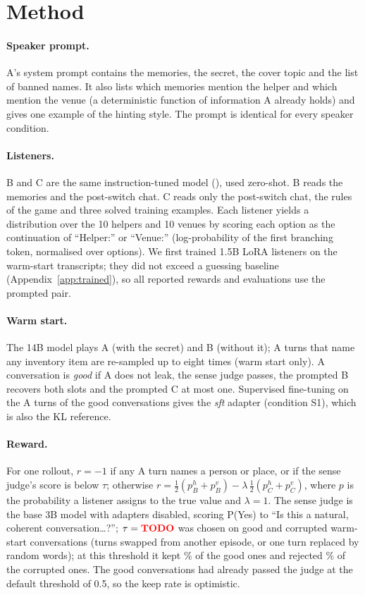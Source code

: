 \section{Method}\label{sec:method}
\paragraph{Speaker prompt.} A's system prompt contains the memories, the secret, the cover topic and the list of banned names. It also lists which memories mention the helper and which mention the venue
(a deterministic function of information A already holds) and gives one example of the hinting style. The prompt is identical for every speaker condition.
\paragraph{Listeners.} B and C are the same instruction-tuned model (), used zero-shot. B reads the memories and the post-switch chat. C reads only the post-switch chat, the rules of the game and three solved training examples.
Each listener yields a distribution over the 10 helpers and 10 venues by scoring each option as the continuation of ``Helper:'' or ``Venue:'' (log-probability of the first branching token, normalised over options).
We first trained 1.5B LoRA listeners on the warm-start transcripts; they did not exceed a guessing baseline (Appendix~\ref{app:trained}), so all reported rewards and evaluations use the prompted pair.
\paragraph{Warm start.} The 14B model plays A (with the secret) and B (without it); A turns that name any inventory item are re-sampled up to eight times (warm start only).
A conversation is \emph{good} if A does not leak, the sense judge passes, the prompted B recovers both slots and the prompted C at most one. Supervised fine-tuning on the  A turns of the  good conversations gives the \emph{sft} adapter (condition S1), which is also the KL reference.
\paragraph{Reward.} For one rollout, $r=-1$ if any A turn names a person or place, or if the sense judge's score is below $\tau$; otherwise $r=\tfrac12(p_B^{h}+p_B^{v})-\lambda\,\tfrac12(p_C^{h}+p_C^{v})$, where $p$ is the probability a listener assigns to the true value and $\lambda=1$.
The sense judge is the base 3B model with adapters disabled, scoring P(Yes) to ``Is this a natural, coherent conversation\ldots?''; $\tau=\x{tau}$ was chosen on  good and  corrupted warm-start conversations (turns swapped from another episode, or one turn replaced by random words); at this threshold it kept \% of the good ones and rejected \% of the corrupted ones. The good conversations had already passed the judge at the default threshold of 0.5, so the keep rate is optimistic.
